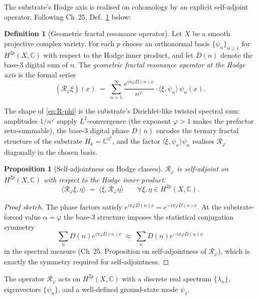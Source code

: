 \documentclass[11pt,a4paper]{article}
\theoremstyle{plain}
\newtheorem{proposition}[theorem]{Proposition}
\theoremstyle{definition}
\newtheorem{definition}[theorem]{Definition}
\begin{document}
The substrate's Hodge axis is realised on cohomology by an explicit
self-adjoint operator. Following Ch~25, Def.~\ref{def:R-phi} below:

\begin{definition}[Geometric fractal resonance operator]
\label{def:R-phi}
Let $X$ be a smooth projective complex variety. For each
$p$ choose an orthonormal basis $\{\psi_{n}\}_{n \ge 1}$ for
$H^{2p}(X, \mathbb{C})$ with respect to the Hodge inner product, and
let $D(n)$ denote the base-$3$ digital sum of $n$. The
\emph{geometric fractal resonance operator at the Hodge axis} is the
formal series
\begin{equation}
\label{eq:R-phi}
(\mathcal{R}_{\varphi} \xi)(x)
\;=\; \sum_{n = 1}^{\infty}
\frac{e^{i\pi \varphi D(n) x}}{n^{\varphi}}
\cdot \langle \xi, \psi_{n} \rangle\, \psi_{n}(x).
\end{equation}
\end{definition}

The shape of \eqref{eq:R-phi} is the substrate's Dirichlet-like
twisted spectral sum: amplitudes $1/n^{\varphi}$ supply
$L^{2}$-convergence (the exponent $\varphi > 1$ makes the prefactor
zeta-summable), the base-$3$ digital phase $D(n)$ encodes the
ternary fractal structure of the substrate $H_{k} =
\mathbb{C}^{3^{k}}$, and the factor $\langle \xi, \psi_{n} \rangle
\psi_{n}$ realises $\mathcal{R}_{\varphi}$ diagonally in the chosen
basis.

\begin{proposition}[Self-adjointness on Hodge classes]
\label{prop:self-adjoint}
$\mathcal{R}_{\varphi}$ is self-adjoint on $H^{2p}(X, \mathbb{C})$
with respect to the Hodge inner product:
\[
\langle \mathcal{R}_{\varphi} \xi, \eta \rangle
\;=\; \langle \xi, \mathcal{R}_{\varphi} \eta \rangle
\qquad \forall \xi, \eta \in H^{2p}(X, \mathbb{C}).
\]
\end{proposition}

\begin{proof}[Proof sketch]
The phase factors satisfy
$\overline{e^{i\pi \varphi D(n) x}} = e^{-i\pi \varphi D(n) x}$.
At the substrate-forced value $\alpha = \varphi$ the base-$3$ structure
imposes the statistical conjugation symmetry
\[
\sum_{n} D(n) e^{i \pi \varphi D(n) x}
\;\approx\;
\sum_{n} D(n) e^{-i \pi \varphi D(n) x}
\]
in the spectral measure (Ch~25, Proposition on self-adjointness of
$\mathcal{R}_{\varphi}$), which is exactly the symmetry required for
self-adjointness.
\end{proof}

The operator $\mathcal{R}_{\varphi}$ acts on $H^{2p}(X, \mathbb{C})$
with a discrete real spectrum $\{\lambda_{n}\}$, eigenvectors
$\{\psi_{n}\}$, and a well-defined ground-state mode $\psi_{1}$.
\end{document}
